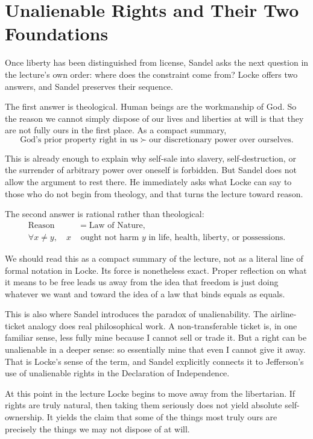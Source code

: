 \section{Unalienable Rights and Their Two Foundations}

Once liberty has been distinguished from license, Sandel asks the next question in the lecture's own order: where does the constraint come from? Locke offers two answers, and Sandel preserves their sequence.

The first answer is theological. Human beings are the workmanship of God. So the reason we cannot simply dispose of our lives and liberties at will is that they are not fully ours in the first place. As a compact summary,
\begin{equation}
\text{God's prior property right in us}\succ \text{our discretionary power over ourselves}.
\end{equation}

This is already enough to explain why self-sale into slavery, self-destruction, or the surrender of arbitrary power over oneself is forbidden. But Sandel does not allow the argument to rest there. He immediately asks what Locke can say to those who do not begin from theology, and that turns the lecture toward reason.

The second answer is rational rather than theological:
\begin{align}
\text{Reason} &= \text{Law of Nature},\\
\forall x\neq y,\quad x &\text{ ought not harm } y \text{ in life, health, liberty, or possessions.}
\end{align}

We should read this as a compact summary of the lecture, not as a literal line of formal notation in Locke. Its force is nonetheless exact. Proper reflection on what it means to be free leads us away from the idea that freedom is just doing whatever we want and toward the idea of a law that binds equals as equals.

This is also where Sandel introduces the paradox of unalienability. The airline-ticket analogy does real philosophical work. A non-transferable ticket is, in one familiar sense, less fully mine because I cannot sell or trade it. But a right can be unalienable in a deeper sense: so essentially mine that even I cannot give it away. That is Locke's sense of the term, and Sandel explicitly connects it to Jefferson's use of unalienable rights in the Declaration of Independence.

At this point in the lecture Locke begins to move away from the libertarian. If rights are truly natural, then taking them seriously does not yield absolute self-ownership. It yields the claim that some of the things most truly ours are precisely the things we may not dispose of at will.

